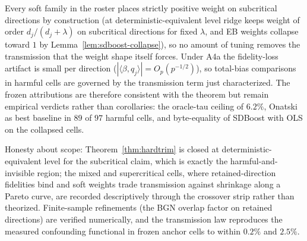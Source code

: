 \begin{corollary}
\label{cor:kill}
Every soft family in the roster places strictly positive weight on subcritical directions by construction (at deterministic-equivalent level ridge keeps weight of order $d_j/(d_j+\lambda)$ on subcritical directions for fixed $\lambda$, and EB weights collapse toward $1$ by Lemma~\ref{lem:sdboost-collapse}), so no amount of tuning removes the transmission that the weight shape itself forces. Under A4a the fidelity-loss artifact is small per direction ($|\langle\beta,q_j\rangle|=O_p(p^{-1/2})$), so total-bias comparisons in harmful cells are governed by the transmission term just characterized. The frozen attributions are therefore consistent with the theorem but remain empirical verdicts rather than corollaries: the oracle-tau ceiling of $6.2\%$, Onatski as best baseline in $89$ of $97$ harmful cells, and byte-equality of SDBoost with OLS on the collapsed cells.
\end{corollary}

Honesty about scope: Theorem~\ref{thm:hardtrim} is closed at deterministic-equivalent level for the subcritical claim, which is exactly the harmful-and-invisible region; the mixed and supercritical cells, where retained-direction fidelities bind and soft weights trade transmission against shrinkage along a Pareto curve, are recorded descriptively through the crossover strip rather than theorized. Finite-sample refinements (the BGN overlap factor on retained directions) are verified numerically, and the transmission law reproduces the measured confounding functional in frozen anchor cells to within $0.2\%$ and $2.5\%$.


